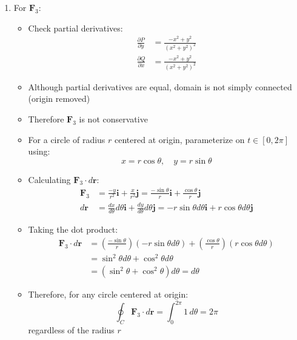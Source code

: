 \begin{example}
\begin{solution}
\begin{enumerate}
    \item For $\mathbf{F}_3$:
    \begin{itemize}
        \item Check partial derivatives:
        \begin{align*}
        \frac{\partial P}{\partial y} &= \frac{-x^2 + y^2}{(x^2 + y^2)^2} \\
        \frac{\partial Q}{\partial x} &= \frac{-x^2 + y^2}{(x^2 + y^2)^2}
        \end{align*}
        \item Although partial derivatives are equal, domain is not simply connected (origin removed)
        \item Therefore $\mathbf{F}_3$ is not conservative
        \item For a circle of radius $r$ centered at origin, parameterize on $t \in [0,2\pi]$ using:
        \[
        x = r\cos\theta, \quad y = r\sin\theta
        \]
        \item Calculating $\mathbf{F}_3 \cdot d\mathbf{r}$:
        \begin{align*}
            \mathbf{F}_3 &= \frac{-y}{r^2}\mathbf{i} + \frac{x}{r^2}\mathbf{j} = \frac{-\sin\theta}{r}\mathbf{i} + \frac{\cos\theta}{r}\mathbf{j} \\
            d\mathbf{r} &= \frac{dx}{d\theta}d\theta\mathbf{i} + \frac{dy}{d\theta}d\theta\mathbf{j} = -r\sin\theta d\theta\mathbf{i} + r\cos\theta d\theta\mathbf{j}
        \end{align*}
        \item Taking the dot product:
        \begin{align*}
            \mathbf{F}_3 \cdot d\mathbf{r} &= \left(\frac{-\sin\theta}{r}\right)(-r\sin\theta d\theta) + \left(\frac{\cos\theta}{r}\right)(r\cos\theta d\theta) \\
            &= \sin^2\theta d\theta + \cos^2\theta d\theta \\
            &= (\sin^2\theta + \cos^2\theta)d\theta = d\theta
        \end{align*}
        \item Therefore, for any circle centered at origin:
        \[
        \oint_C \mathbf{F}_3\cdot d\mathbf{r} = \int_0^{2\pi} 1\,d\theta = 2\pi
        \]
        regardless of the radius $r$
    \end{itemize}

\end{enumerate}
\end{solution}
\end{example}
\exampleline

